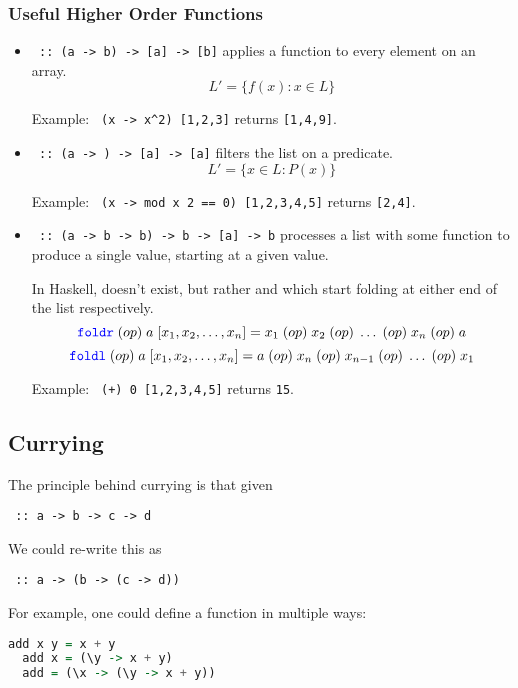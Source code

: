 \subsubsection{Useful Higher Order Functions}
\begin{itemize}
  \item \texttt{ :: (a -> b) -> [a] -> [b]} applies a function to every element on an array.
  \[L' = \{f(x) : x \in L\}\]
  
  Example: \texttt{ (x -> x\string^2) [1,2,3]} returns \texttt{[1,4,9]}.
  \item \texttt{ :: (a -> ) -> [a] -> [a]} filters the list on a predicate.
  \[L' = \{x \in L : P(x)\}\]
  
  Example: \texttt{ (x -> mod x 2 == 0) [1,2,3,4,5]} returns \texttt{[2,4]}.
  \item \texttt{ :: (a -> b -> b) -> b -> [a] -> b} processes a list with some function to produce a single value, starting at a given value.
  
  In Haskell, \texttt{} doesn't exist, but rather \texttt{} and \texttt{} which start folding at either end of the list respectively.
  \[\texttt{\textcolor{blue}{foldr}}\; (op)\; a\; [x_1, x_2, \ldots, x_n] = x_1\; (op)\; x_2\; (op)\; \ldots\; (op)\; x_n\; (op)\; a\]
  \[\texttt{\textcolor{blue}{foldl}}\; (op)\; a\; [x_1, x_2, \ldots, x_n] = a\; (op)\; x_n\; (op)\; x_{n-1}\; (op)\; \ldots\; (op)\; x_1\]

  Example: \texttt{ (+) 0 [1,2,3,4,5]} returns \texttt{15}.
\end{itemize}

\subsection{Currying}
The principle behind currying is that given
\begin{center}
  \texttt{ :: a -> b -> c -> d}
\end{center}
We could re-write this as
\begin{center}
  \texttt{ :: a -> (b -> (c -> d))}
\end{center}

For example, one could define a function \texttt{} in multiple ways:
\begin{lstlisting}[language=haskell]
  add x y = x + y
  add x = (\y -> x + y)
  add = (\x -> (\y -> x + y))
\end{lstlisting}


